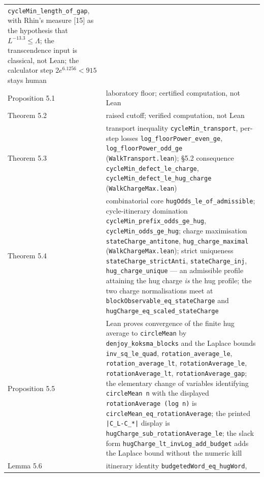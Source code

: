 \documentclass[12pt]{article}
\begin{document}
\begin{longtable}[]{@{}
  >{\raggedright\arraybackslash}p{}
  >{\raggedright\arraybackslash}p{}@{}}
\texttt{\nolinkurl{cycleMin_length_of_gap}}, with Rhin's measure
{[}15{]} as the hypothesis that \(L^{-13.3}\le\Lambda\); the
transcendence input is classical, not Lean; the calculator step
\(2e^{6.1256}<915\) stays human \\
Proposition 5.1 & laboratory floor; certified computation, not Lean \\
Theorem 5.2 & raised cutoff; verified computation, not Lean \\
Theorem 5.3 & transport inequality
\texttt{\nolinkurl{cycleMin_transport}}, per-step losses
\texttt{\nolinkurl{log_floorPower_even_ge}},
\texttt{\nolinkurl{log_floorPower_odd_ge}}
(\texttt{\nolinkurl{WalkTransport.lean}}); §5.2 consequence
\texttt{\nolinkurl{cycleMin_defect_le_charge}},
\texttt{\nolinkurl{cycleMin_defect_le_hug_charge}}
(\texttt{\nolinkurl{WalkChargeMax.lean}}) \\
Theorem 5.4 & combinatorial core
\texttt{\nolinkurl{hugOdds_le_of_admissible}}; cycle-itinerary
domination \texttt{\nolinkurl{cycleMin_prefix_odds_ge_hug}},
\texttt{\nolinkurl{cycleMin_odds_ge_hug}}; charge maximisation
\texttt{\nolinkurl{stateCharge_antitone}},
\texttt{\nolinkurl{hug_charge_maximal}}
(\texttt{\nolinkurl{WalkChargeMax.lean}}); strict uniqueness
\texttt{\nolinkurl{stateCharge_strictAnti}},
\texttt{\nolinkurl{stateCharge_inj}},
\texttt{\nolinkurl{hug_charge_unique}} --- an admissible profile
attaining the hug charge \emph{is} the hug profile; the two charge
normalisations meet at
\texttt{\nolinkurl{blockObservable_eq_stateCharge}} and
\texttt{\nolinkurl{hugCharge_eq_scaled_stateCharge}} \\
Proposition 5.5 & Lean proves convergence of the finite hug average to
\texttt{\nolinkurl{circleMean}} by
\texttt{\nolinkurl{denjoy_koksma_blocks}} and the Laplace bounds
\texttt{\nolinkurl{inv_sq_le_quad}},
\texttt{\nolinkurl{rotation_average_le}},
\texttt{\nolinkurl{rotation_average_lt}},
\texttt{\nolinkurl{rotationAverage_le}},
\texttt{\nolinkurl{rotationAverage_lt}},
\texttt{\nolinkurl{rotationAverage_gap}}; the elementary change of
variables identifying \texttt{circleMean\ n\textquotesingle{}} with the
displayed \texttt{rotationAverage\ (log\ n\textquotesingle{})} is
\texttt{\nolinkurl{circleMean_eq_rotationAverage}}; the printed
\texttt{\nolinkurl{|C_L-C_*|}} display is
\texttt{\nolinkurl{hugCharge_sub_rotationAverage_le}}; the slack form
\texttt{\nolinkurl{hugCharge_lt_invLog_add_budget}} adds the Laplace
bound without the numeric kill \\
Lemma 5.6 & itinerary identity
\texttt{\nolinkurl{budgetedWord_eq_hugWord}},

\end{longtable}
\end{document}

